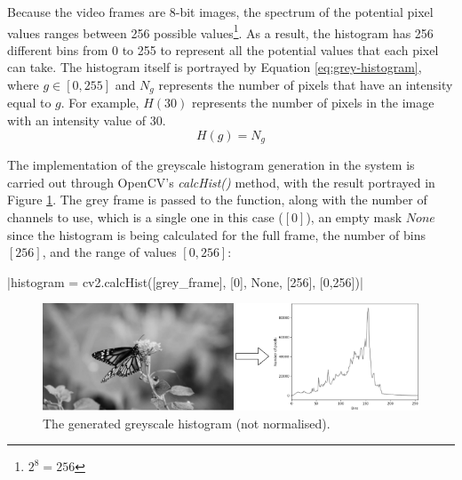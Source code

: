 Because the video frames are 8-bit images, the spectrum of the potential pixel values ranges between 256 possible values\footnote{$2^8=256$}. As a result, the histogram has 256 different bins from 0 to 255 to represent all the potential values that each pixel can take. The histogram itself is portrayed by Equation \ref{eq:grey-histogram}, where $g\in [0, 255]$ and $N_g$ represents the number of pixels that have an intensity equal to $g$. For example, $H(30)$ represents the number of pixels in the image with an intensity value of 30.
\begin{equation}
\label{eq:grey-histogram}
    H(g)=N_g
\end{equation}

The implementation of the greyscale histogram generation in the system is carried out through OpenCV's \textit{calcHist()} method, with the result portrayed in Figure \ref{fig:implementation-greyscale_not_normalised}. The grey frame is passed to the function, along with the number of channels to use, which is a single one in this case ($[0]$), an empty mask $None$ since the histogram is being calculated for the full frame, the number of bins $[256]$, and the range of values $[0, 256]$:

|histogram = cv2.calcHist([grey_frame], [0], None, [256], [0,256])|

\begin{figure}[h] 
\centerline{\includegraphics[width=\textwidth]{figures/implementation/greyscale_not_normalised.png}}
\caption{\label{fig:implementation-greyscale_not_normalised}The generated greyscale histogram (not normalised).}
\end{figure}

